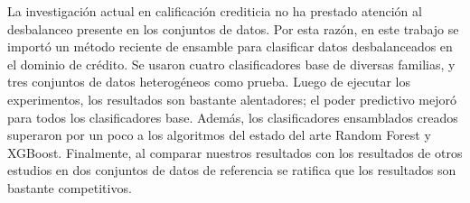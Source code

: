 \begin{resumen}
La investigación actual en calificación crediticia no ha prestado atención al desbalanceo presente en los conjuntos de datos. Por esta razón, en este trabajo se importó un método reciente de ensamble para clasificar datos desbalanceados en el dominio de crédito. Se usaron cuatro clasificadores base de diversas familias, y tres conjuntos de datos heterogéneos como prueba. Luego de ejecutar los experimentos, los resultados son bastante alentadores; el poder predictivo mejoró para todos los clasificadores base. Además, los clasificadores ensamblados creados superaron por un poco a los algoritmos del estado del arte Random Forest y XGBoost. Finalmente, al comparar nuestros resultados con los resultados de otros estudios en dos conjuntos de datos de referencia se ratifica que los resultados son bastante competitivos.
\end{resumen}
